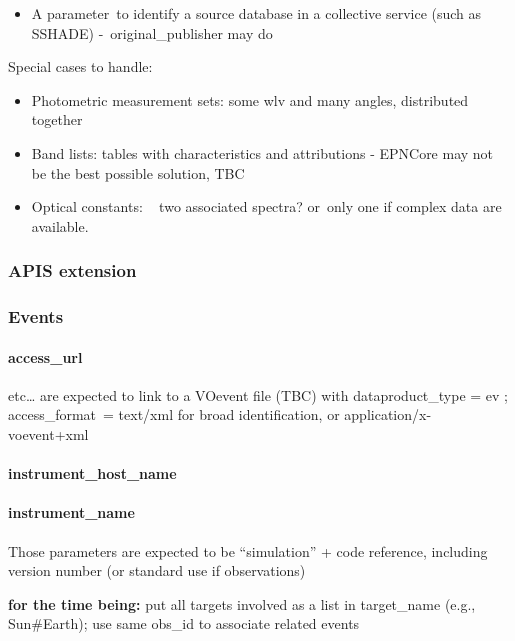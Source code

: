 \documentclass[11pt,a4paper]{ivoa}
\begin{document}
\begin{itemize}
\item A parameter to identify a source database in a collective service (such as SSHADE) - original\_publisher may do
\end{itemize}

Special cases to handle:

\begin{itemize}
\item Photometric measurement sets: some wlv and many angles, distributed together
\item Band lists: tables with characteristics and attributions - EPNCore may not be the best possible solution, TBC
\item Optical constants: ~ two associated spectra? or only one if complex data are available.
\end{itemize}

\subsubsection{APIS extension\\}

\subsubsection{Events\\}

\paragraph{access\_url\textbf{ }}

etc… are expected to link to a VOevent file (TBC) with dataproduct\_type = ev ; access\_format = text/xml for broad identification, or application/x-voevent+xml 

\paragraph{instrument\_host\_name}

\paragraph{instrument\_name}

Those parameters are expected to be ``simulation'' + code reference, including version number (or standard use if observations)

\textbf{for the time being:} put all targets involved as a list in target\_name (e.g., Sun\#Earth); use same obs\_id to associate related events
\end{document}
